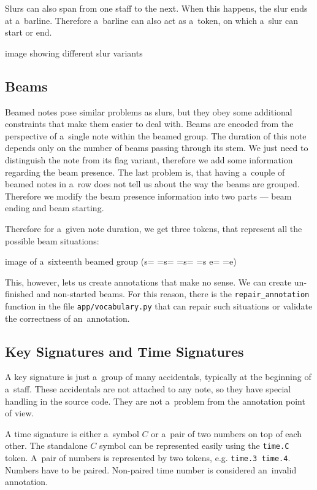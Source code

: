 Slurs can also span from one staff to the next. When this happens, the slur ends at a~barline. Therefore a~barline can also act as a~token, on which a~slur can start or end.

\begin{code}
image showing different slur variants
\end{code}


\subsection{Beams}

Beamed notes pose similar problems as slurs, but they obey some additional constraints that make them easier to deal with. Beams are encoded from the perspective of a~single note within the beamed group. The duration of this note depends only on the number of beams passing through its stem. We just need to distinguish the note from its flag variant, therefore we add some information regarding the beam presence. The last problem is, that having a~couple of beamed notes in a~row does not tell us about the way the beams are grouped. Therefore we modify the beam presence information into two parts --- beam ending and beam starting.

Therefore for a~given note duration, we get three tokens, that represent all the possible beam situations:

\begin{code}
image of a~sixteenth beamed group (s= =s= =s= =s e= =e)
\end{code}

This, however, lets us create annotations that make no sense. We can create un-finished and non-started beams. For this reason, there is the \verb`repair_`\allowbreak\verb`annotation` function in the file \verb`app/vocabulary.py` that can repair such situations or validate the correctness of an~annotation.


\subsection{Key Signatures and Time Signatures}

A key signature is just a~group of many accidentals, typically at the beginning of a~staff. These accidentals are not attached to any note, so they have special handling in the source code. They are not a~problem from the annotation point of view.

A time signature is either a~symbol $C$ or a~pair of two numbers on top of each other. The standalone $C$ symbol can be represented easily using the \verb`time.C` token. A~pair of numbers is represented by two tokens, e.g. \verb`time.3 time.4`. Numbers have to be paired. Non-paired time number is considered an~invalid annotation.

